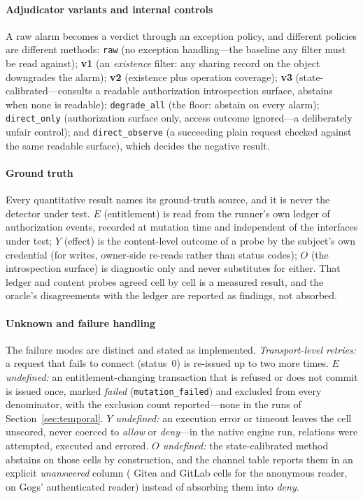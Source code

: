 \paragraph{Adjudicator variants and internal controls}
A raw alarm becomes a verdict through an exception policy, and different policies
are different methods: \texttt{raw} (no exception handling---the baseline any filter
must be read against); \textbf{v1} (an \emph{existence} filter: any sharing record on
the object downgrades the alarm); \textbf{v2} (existence plus operation coverage);
\textbf{v3} (state-calibrated---consults a readable authorization introspection
surface, abstains when none is readable); \texttt{degrade\_all} (the floor: abstain
on every alarm); \texttt{direct\_only} (authorization surface only, access outcome
ignored---a deliberately unfair control); and \texttt{direct\_observe} (a succeeding
plain request checked against the same readable surface), which decides the negative
result.

\paragraph{Ground truth}
Every quantitative result names its ground-truth source, and it is never the detector
under test. $E$ (entitlement) is read from the runner's own ledger of authorization
events, recorded at mutation time and independent of the interfaces under test; $Y$
(effect) is the content-level outcome of a probe by the subject's own credential (for
writes, owner-side re-reads rather than status codes); $O$ (the introspection surface)
is diagnostic only and never substitutes for either. That ledger and content probes
agreed cell by cell is a measured result, and the oracle's disagreements with the
ledger are reported as findings, not absorbed.

\paragraph{Unknown and failure handling}
The failure modes are distinct and stated as implemented. \emph{Transport-level
retries:} a request that fails to connect (status~0) is re-issued up to two more times.
\emph{$E$ undefined:} an entitlement-changing transaction that is refused or does not
commit is issued once, marked \emph{failed} (\texttt{mutation\_failed}) and excluded
from every denominator, with the exclusion count reported---none in the runs of
Section~\ref{sec:temporal}. \emph{$Y$ undefined:} an
execution error or timeout leaves the cell unscored, never coerced to \emph{allow} or
\emph{deny}---in the native engine run, \NtMrTotal{} relations were attempted,
\NtMrExecuted{} executed and \NtMrErrored{} errored. \emph{$O$ undefined:} the
state-calibrated method abstains on those cells by construction, and the channel table
reports them in an explicit \emph{unanswered} column (\TmpUnansGitea{} Gitea and
\TmpUnansGitlab{} GitLab cells for the anonymous reader, \GgChUnans{} on Gogs'
authenticated reader) instead of absorbing them into \emph{deny}.

